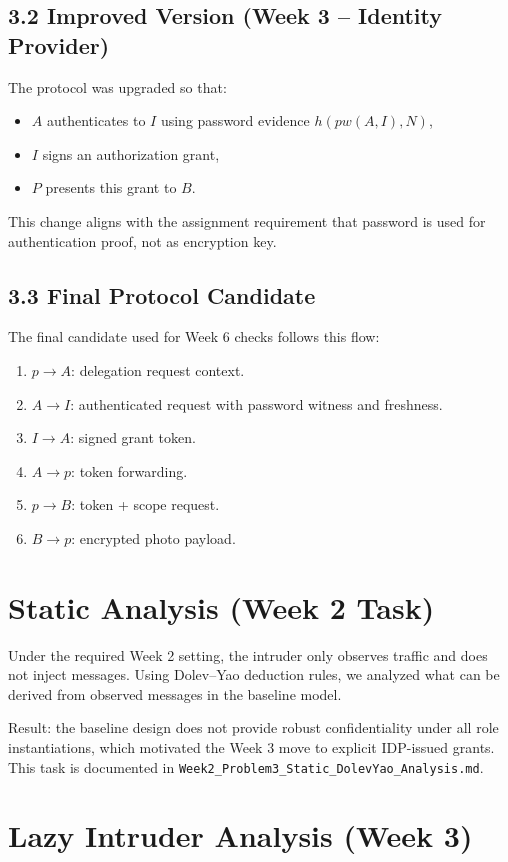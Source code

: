 \documentclass[11pt,a4paper]{article}
\begin{document}
\subsection{3.2 Improved Version (Week 3 -- Identity Provider)}
The protocol was upgraded so that:
\begin{itemize}
  \item $A$ authenticates to $I$ using password evidence $h(pw(A,I),N)$,
  \item $I$ signs an authorization grant,
  \item $P$ presents this grant to $B$.
\end{itemize}
This change aligns with the assignment requirement that password is used for authentication proof, not as encryption key.

\subsection{3.3 Final Protocol Candidate}
The final candidate used for Week 6 checks follows this flow:
\begin{enumerate}
  \item $p \rightarrow A$: delegation request context.
  \item $A \rightarrow I$: authenticated request with password witness and freshness.
  \item $I \rightarrow A$: signed grant token.
  \item $A \rightarrow p$: token forwarding.
  \item $p \rightarrow B$: token + scope request.
  \item $B \rightarrow p$: encrypted photo payload.
\end{enumerate}

\section{Static Analysis (Week 2 Task)}

Under the required Week 2 setting, the intruder only observes traffic and does not inject messages.
Using Dolev--Yao deduction rules, we analyzed what can be derived from observed messages in the baseline model.

Result: the baseline design does not provide robust confidentiality under all role instantiations, which motivated the Week 3 move to explicit IDP-issued grants.
This task is documented in \texttt{Week2\_Problem3\_Static\_DolevYao\_Analysis.md}.

\section{Lazy Intruder Analysis (Week 3)}
\end{document}
